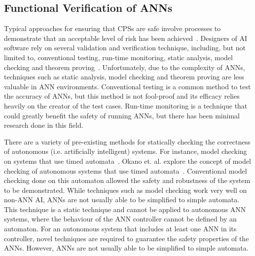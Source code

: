 \subsection{Functional Verification of \acfp{ANN}}
Typical approaches for ensuring that \acp{CPS} are safe involve processes to demonstrate that an acceptable level of risk has been achieved~\cite{scann}. 
Designers of \ac{AI} software rely on several validation and verification technique, including, but not limited to, conventional testing, run-time monitoring, static analysis, model checking and theorem proving~\cite{menzies2005verification}.
Unfortunately, due to the complexity of \acfp{ANN}, techniques such as static analysis, model checking and theorem proving are less valuable in \ac{ANN} environments. 
Conventional testing is a common method to test the accuracy of \acp{ANN}, but this method is not fool-proof and its efficacy relies heavily on the creator of the test cases.
Run-time monitoring is a technique that could greatly benefit the safety of running \acp{ANN}, but there has been minimal research done in this field.

There are a variety of pre-existing methods for statically checking the correctness of autonomous (i.e. artificially intelligent) systems.
For instance, model checking on systems that use timed automata~\cite{timed-enf-autonomous}.
Okano et. al. explore the concept of model checking of autonomous systems that use timed automata~\cite{timed-enf-autonomous}.
Conventional model checking done on this automaton allowed the safety and robustness of the system to be demonstrated.
While techniques such as model checking work very well on non-\ac{ANN} \ac{AI}, \acp{ANN} are not usually able to be simplified to simple automata. 
This technique is a static technique and cannot be applied to autonomous \ac{ANN} systems, where the behaviour of the \ac{ANN} controller cannot be defined by an automaton.
For an autonomous system that includes at least one \ac{ANN} in its controller, novel techniques are required to guarantee the safety properties of the \acp{ANN}.
However, \acp{ANN} are not usually able to be simplified to simple automata.

